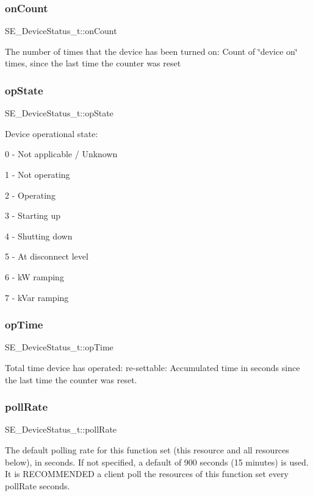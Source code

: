 \subsubsection{\texorpdfstring{on\+Count}{onCount}}
{\footnotesize\ttfamily S\+E\+\_\+\+Device\+Status\+\_\+t\+::on\+Count}

The number of times that the device has been turned on\+: Count of \char`\"{}device on\char`\"{} times, since the last time the counter was reset \mbox{\label{group__DeviceStatus_ga298a44d2837e5f528c9f81ec73c69fc7}} 
\subsubsection{\texorpdfstring{op\+State}{opState}}
{\footnotesize\ttfamily S\+E\+\_\+\+Device\+Status\+\_\+t\+::op\+State}

Device operational state\+:

0 -\/ Not applicable / Unknown

1 -\/ Not operating

2 -\/ Operating

3 -\/ Starting up

4 -\/ Shutting down

5 -\/ At disconnect level

6 -\/ kW ramping

7 -\/ k\+Var ramping \mbox{\label{group__DeviceStatus_ga6c24575c59f3ab054c989011e29e5d5d}} 
\subsubsection{\texorpdfstring{op\+Time}{opTime}}
{\footnotesize\ttfamily S\+E\+\_\+\+Device\+Status\+\_\+t\+::op\+Time}

Total time device has operated\+: re-\/settable\+: Accumulated time in seconds since the last time the counter was reset. \mbox{\label{group__DeviceStatus_ga128ee35b8323aa8aa753b754fd502ec8}} 
\subsubsection{\texorpdfstring{poll\+Rate}{pollRate}}
{\footnotesize\ttfamily S\+E\+\_\+\+Device\+Status\+\_\+t\+::poll\+Rate}

The default polling rate for this function set (this resource and all resources below), in seconds. If not specified, a default of 900 seconds (15 minutes) is used. It is R\+E\+C\+O\+M\+M\+E\+N\+D\+ED a client poll the resources of this function set every poll\+Rate seconds. 